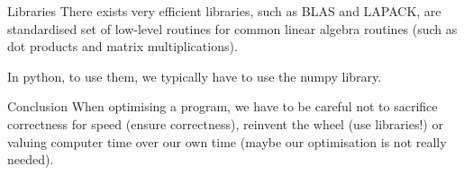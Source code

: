 \documentclass[a4paper]{article}
\begin{document}
\begin{parag}{Libraries}
    There exists very efficient libraries, such as BLAS and LAPACK, are standardised set of low-level routines for common linear algebra routines (such as dot products and matrix multiplications). 

    In python, to use them, we typically have to use the numpy library.
\end{parag}

\begin{parag}{Conclusion}
    When optimising a program, we have to be careful not to sacrifice correctness for speed (ensure correctness), reinvent the wheel (use libraries!) or valuing computer time over our own time (maybe our optimisation is not really needed).
\end{parag}
\end{document}
